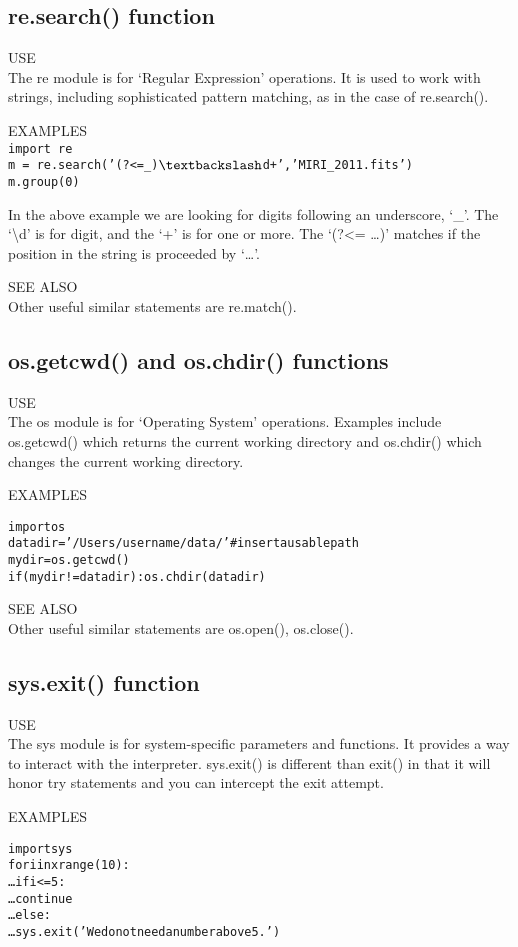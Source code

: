 \subsection{ {\sf re.search() } function}
{\color{blue} {\sf\small USE}} \\
The {\sf\small re} module is for `Regular Expression' operations.
It is used to work with strings, including sophisticated pattern
matching, as in the case of {\sf \small re.search()}.

{\color{blue} {\sf\small EXAMPLES}}  \\
\texttt{\pytab import re}  \\
\texttt{\pytab m = re.search('(?<=\_)$\textbackslash$d+','MIRI\_2011.fits')} \\
\texttt{\pytab m.group(0)}

In the above example we are looking for digits following an
underscore, `\_'.  The `\textbackslash d' is for digit, and the `+' is
for one or more.  The `(?<= \ldots )' matches if the position in the
string is proceeded by `\ldots'.
 
{\color{blue} {\sf\small SEE ALSO}} \\
Other useful similar statements are {\sf\small re.match()}. 

\subsection{ {\sf os.getcwd() and os.chdir() } functions}
{\color{blue} {\sf\small USE}} \\
The {\sf\small os} module is for `Operating System' operations.
Examples include {\sf \small os.getcwd()} which returns the current
working directory and {\sf \small os.chdir()} which changes the current
working directory.

{\color{blue} {\sf\small EXAMPLES}} 
\begin{alltt}
\pytab import os 
\pytab datadir = '/Users/username/data/'  #insert a usable path 
\pytab mydir = os.getcwd()  
\pytab if (mydir != datadir): os.chdir(datadir) 
\end{alltt}
{\color{blue} {\sf\small SEE ALSO}} \\
Other useful similar statements are {\sf\small os.open(),
  os.close()}. 

\subsection{ {\sf sys.exit()} function}
{\color{blue} {\sf\small USE}} \\
The {\sf\small sys} module is for system-specific parameters and
functions.  It provides a way to interact with the interpreter.
{\sf\small sys.exit()} is different than {\sf\small exit()} in that it
will honor {\sf\small try} statements and you can
intercept the exit attempt.

{\color{blue} {\sf\small EXAMPLES}} 
\begin{alltt}
\pytab import sys
\pytab for i in xrange(10):
\ldots        if i <= 5:
\ldots            continue
\ldots        else:
\ldots            sys.exit('We do not need a number above 5.')
\end{alltt}




